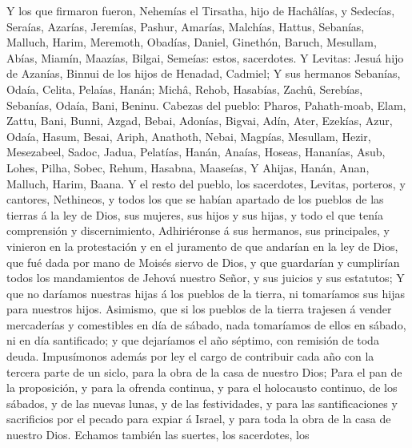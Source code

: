  Y los que firmaron fueron, Nehemías el Tirsatha, hijo de
Hachâlías, y Sedecías,  Seraías, Azarías, Jeremías,
 Pashur, Amarías, Malchías,  Hattus, Sebanías,
Malluch,  Harim, Meremoth, Obadías,  Daniel,
Ginethón, Baruch,  Mesullam, Abías, Miamín, 
Maazías, Bilgai, Semeías: estos, sacerdotes.  Y Levitas:
Jesuá hijo de Azanías, Binnui de los hijos de Henadad, Cadmiel;
 Y sus hermanos Sebanías, Odaía, Celita, Pelaías, Hanán;
 Michâ, Rehob, Hasabías,  Zachû, Serebías,
Sebanías,  Odaía, Bani, Beninu.  Cabezas del
pueblo: Pharos, Pahath-moab, Elam, Zattu, Bani,  Bunni,
Azgad, Bebai,  Adonías, Bigvai, Adín,  Ater,
Ezekías, Azur,  Odaía, Hasum, Besai,  Ariph,
Anathoth, Nebai,  Magpías, Mesullam, Hezir, 
Mesezabeel, Sadoc, Jadua,  Pelatías, Hanán, Anaías,
 Hoseas, Hananías, Asub,  Lohes, Pilha, Sobec,
 Rehum, Hasabna, Maaseías,  Y Ahijas, Hanán,
Anan,  Malluch, Harim, Baana.  Y el resto del
pueblo, los sacerdotes, Levitas, porteros, y cantores, Nethineos, y
todos los que se habían apartado de los pueblos de las tierras á la ley
de Dios, sus mujeres, sus hijos y sus hijas, y todo el que tenía
comprensión y discernimiento,  Adhiriéronse á sus hermanos,
sus principales, y vinieron en la protestación y en el juramento de que
andarían en la ley de Dios, que fué dada por mano de Moisés siervo de
Dios, y que guardarían y cumplirían todos los mandamientos de Jehová
nuestro Señor, y sus juicios y sus estatutos;  Y que no
daríamos nuestras hijas á los pueblos de la tierra, ni tomaríamos sus
hijas para nuestros hijos.  Asimismo, que si los pueblos de
la tierra trajesen á vender mercaderías y comestibles en día de sábado,
nada tomaríamos de ellos en sábado, ni en día santificado; y que
dejaríamos el año séptimo, con remisión de toda deuda. 
Impusímonos además por ley el cargo de contribuir cada año con la
tercera parte de un siclo, para la obra de la casa de nuestro Dios;
 Para el pan de la proposición, y para la ofrenda continua,
y para el holocausto continuo, de los sábados, y de las nuevas lunas, y
de las festividades, y para las santificaciones y sacrificios por el
pecado para expiar á Israel, y para toda la obra de la casa de nuestro
Dios.  Echamos también las suertes, los sacerdotes, los
